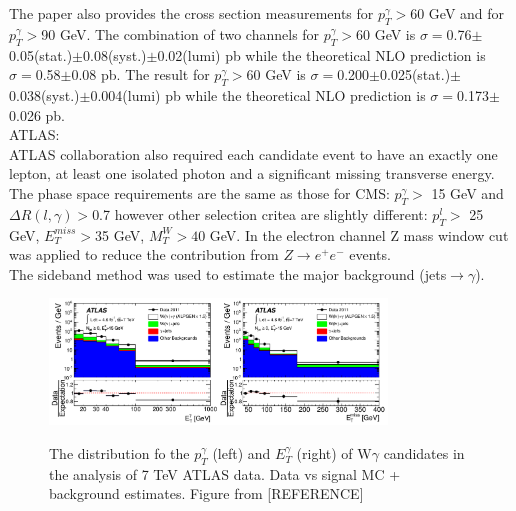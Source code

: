 The paper also provides the cross section measurements for $p_T^\gamma>$60 GeV and for $p_T^\gamma>$90 GeV. The combination of two channels for $p_T^\gamma>$60 GeV is $\sigma=$0.76$\pm$0.05(stat.)$\pm$0.08(syst.)$\pm$0.02(lumi) pb while the theoretical NLO prediction is $\sigma=$0.58$\pm$0.08 pb. The result for $p_T^\gamma>$60 GeV is $\sigma=$0.200$\pm$0.025(stat.)$\pm$0.038(syst.)$\pm$0.004(lumi) pb while the theoretical NLO prediction is $\sigma=$0.173$\pm$0.026 pb.\\




ATLAS:\\


ATLAS collaboration also required each candidate event to have an exactly one lepton, at least one isolated photon and a significant missing transverse energy. The phase space requirements are the same as those for CMS: $p_T^{\gamma}>$ 15 GeV and $\Delta R(l,\gamma)>$0.7 however other selection critea are slightly different: $p_T^l>$ 25 GeV, $E_T^{miss}>$35 GeV, $M_T^W>40$ GeV. In the electron channel Z mass window cut was applied to reduce the contribution from $Z\rightarrow e^+e^-$ events.\\

The sideband method was used to estimate the major background (jets$\rightarrow\gamma$). 

\begin{figure}[htb]
  \begin{center}
    {\includegraphics[width=0.80\textwidth]{../figs/WgAbout/Wg7TeV_ATLAS_ptGamma.png}}
    \caption{The distribution fo the $p_T^\gamma$ (left) and $E_T^\gamma$ (right) of W$\gamma$ candidates in the analysis of 7 TeV ATLAS data. Data vs signal MC + background estimates. Figure from [REFERENCE]}
    \label{fig:Wg7TeV_ATLAS_ptGamma}
  \end{center}
\end{figure}




